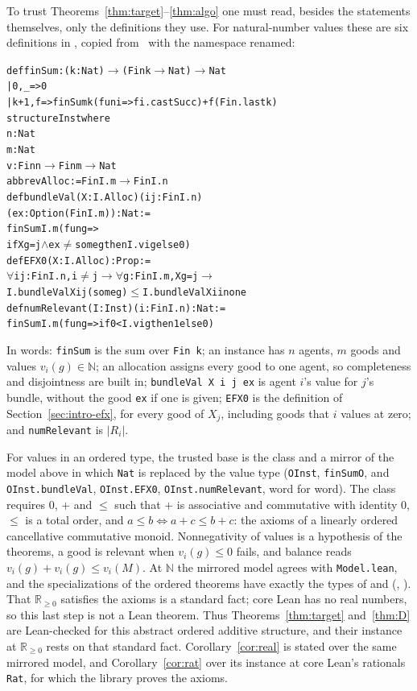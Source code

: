 \documentclass[runningheads,11pt]{llncs}
\begin{document}
To trust Theorems~\ref{thm:target}--\ref{thm:algo} one must read, besides the statements themselves, only the definitions they use. For natural-number values these are six definitions in , copied from~\cite{MrdEfx} with the namespace renamed:
\begin{alltt}\small
def finSum : (k : Nat) \(\to\) (Fin k \(\to\) Nat) \(\to\) Nat
  | 0, _ => 0
  | k+1, f => finSum k (fun i => f i.castSucc) + f (Fin.last k)
structure Inst where
  n : Nat
  m : Nat
  v : Fin n \(\to\) Fin m \(\to\) Nat
abbrev Alloc := Fin I.m \(\to\) Fin I.n
def bundleVal (X : I.Alloc) (i j : Fin I.n)
    (ex : Option (Fin I.m)) : Nat :=
  finSum I.m (fun g =>
    if X g = j \(\wedge\) ex \(\ne\) some g then I.v i g else 0)
def EFX0 (X : I.Alloc) : Prop :=
  \(\forall\) i j : Fin I.n, i \(\ne\) j \(\to\) \(\forall\) g : Fin I.m, X g = j \(\to\)
    I.bundleVal X i j (some g) \(\le\) I.bundleVal X i i none
def numRelevant (I : Inst) (i : Fin I.n) : Nat :=
  finSum I.m (fun g => if 0 < I.v i g then 1 else 0)
\end{alltt}
In words: \texttt{finSum} is the sum over \texttt{Fin k}; an instance has $n$ agents, $m$ goods and values $v_i(g)\in\mathbb{N}$; an allocation assigns every good to one agent, so completeness and disjointness are built in; \texttt{bundleVal X i j ex} is agent $i$'s value for $j$'s bundle, without the good \texttt{ex} if one is given; \texttt{EFX0} is the definition of Section~\ref{sec:intro-efx}, for every good of $X_j$, including goods that $i$ values at zero; and \texttt{numRelevant} is $|R_i|$.

For values in an ordered type, the trusted base is the class  and a mirror of the model above in which \texttt{Nat} is replaced by the value type (\texttt{OInst}, \texttt{finSumO}, and \texttt{OInst.bundleVal}, \texttt{OInst.EFX0}, \texttt{OInst.numRelevant}, word for word). The class requires $0$, $+$ and $\le$ such that $+$ is associative and commutative with identity $0$, $\le$ is a total order, and $a\le b\iff a+c\le b+c$: the axioms of a linearly ordered cancellative commutative monoid. Nonnegativity of values is a hypothesis of the theorems, a good is relevant when $v_i(g)\le0$ fails, and balance reads $v_i(g)+v_i(g)\le v_i(M)$. At $\mathbb{N}$ the mirrored model agrees with \texttt{Model.lean}, and the specializations of the ordered theorems have exactly the types of  and  (, ). That $\mathbb{R}_{\ge0}$ satisfies the axioms is a standard fact; core Lean has no real numbers, so this last step is not a Lean theorem. Thus Theorems~\ref{thm:target} and~\ref{thm:D} are Lean-checked for this abstract ordered additive structure, and their instance at $\mathbb{R}_{\ge0}$ rests on that standard fact. Corollary~\ref{cor:real} is stated over the same mirrored model, and Corollary~\ref{cor:rat} over its instance at core Lean's rationals \texttt{Rat}, for which the library proves the axioms.
\end{document}
